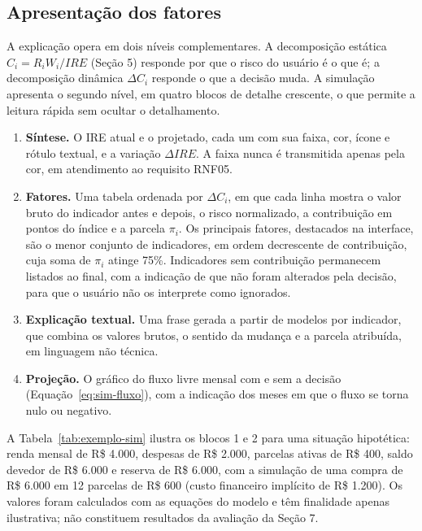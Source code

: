\documentclass[portuguese]{sbc2025}%
\begin{document}
\subsection{Apresentação dos fatores}

A explicação opera em dois níveis complementares. A decomposição estática $C_i = R_i W_i / IRE$ (Seção 5) responde por que o risco do usuário é o que é; a decomposição dinâmica $\Delta C_i$ responde o que a decisão muda. A simulação apresenta o segundo nível, em quatro blocos de detalhe crescente, o que permite a leitura rápida sem ocultar o detalhamento.

\begin{enumerate}[leftmargin=*,itemsep=2pt]
    \item \textbf{Síntese.} O IRE atual e o projetado, cada um com sua faixa, cor, ícone e rótulo textual, e a variação $\Delta IRE$. A faixa nunca é transmitida apenas pela cor, em atendimento ao requisito RNF05.
    \item \textbf{Fatores.} Uma tabela ordenada por $\Delta C_i$, em que cada linha mostra o valor bruto do indicador antes e depois, o risco normalizado, a contribuição em pontos do índice e a parcela $\pi_i$. Os principais fatores, destacados na interface, são o menor conjunto de indicadores, em ordem decrescente de contribuição, cuja soma de $\pi_i$ atinge 75\%. Indicadores sem contribuição permanecem listados ao final, com a indicação de que não foram alterados pela decisão, para que o usuário não os interprete como ignorados.
    \item \textbf{Explicação textual.} Uma frase gerada a partir de modelos por indicador, que combina os valores brutos, o sentido da mudança e a parcela atribuída, em linguagem não técnica.
    \item \textbf{Projeção.} O gráfico do fluxo livre mensal com e sem a decisão (Equação~\ref{eq:sim-fluxo}), com a indicação dos meses em que o fluxo se torna nulo ou negativo.
\end{enumerate}

A Tabela~\ref{tab:exemplo-sim} ilustra os blocos 1 e 2 para uma situação hipotética: renda mensal de R\$ 4.000, despesas de R\$ 2.000, parcelas ativas de R\$ 400, saldo devedor de R\$ 6.000 e reserva de R\$ 6.000, com a simulação de uma compra de R\$ 6.000 em 12 parcelas de R\$ 600 (custo financeiro implícito de R\$ 1.200). Os valores foram calculados com as equações do modelo e têm finalidade apenas ilustrativa; não constituem resultados da avaliação da Seção 7.
\end{document}
